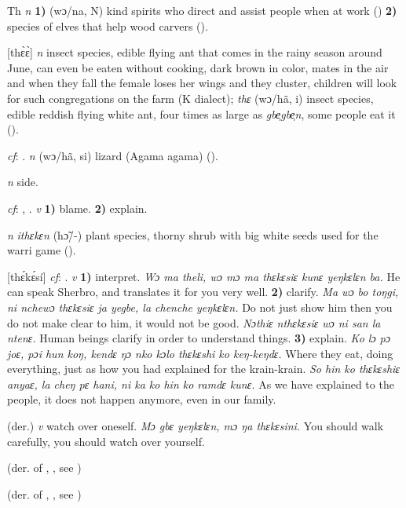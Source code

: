\begin{letter}{Th}
 \textit{n} \textbf{1)} (wɔ/na, N) kind spirits who direct and assist people when at work (\citealt{Pichl1967}) \textbf{2)} species of elves that help wood carvers (\citealt{Hall1938}).

 [thɛ̀ɛ̀] \textit{n} insect species, edible flying ant that comes in the rainy season around June, can even be eaten without cooking, dark brown in color, mates in the air and when they fall the female loses her wings and they cluster, children will look for such congregations on the farm (K dialect); \textit{thɛ} (wɔ/hã, i) insect species, edible reddish flying white ant, four times as large as \textit{gbe̹gbe̹n}, some people eat it (\citealt{Pichl1967}). 

 \textit{cf}: . \textit{n} (wɔ/hã, si) lizard (Agama agama) (\citealt{Pichl1967}). 

 \textit{n} side.

 \textit{cf}: , . \textit{v} \textbf{1)} blame. \textbf{2)} explain.

 \textit{n} \textit{ithɛkɛn} (hɔ̃/-) plant species, thorny shrub with big white seeds used for the warri game (\citealt{Pichl1967}). 

 [thɛ́kɛ́sí] \textit{cf}: . \textit{v} \textbf{1)} interpret. \textit{Wɔ ma theli, wɔ mɔ ma thɛkɛsiɛ kunɛ yeŋkɛlɛn ba.} He can speak Sherbro, and translates it for you very well. \textbf{2)} clarify. \textit{Ma wɔ bo toŋgi, ni nchewɔ thɛkɛsiɛ ja yegbe, la chenche yeŋkɛlɛn.} Do not just show him then you do not make clear to him, it would not be good. \textit{Nɔthiɛ nthɛkɛsiɛ wɔ ni san la ntenɛ.} Human beings clarify in order to understand things. \textbf{3)} explain. \textit{Ko lɔ pɔ joɛ, pɔi hun koŋ, kendɛ ŋɔ nko kɔlo thɛkɛshi ko keŋ-keŋdɛ.} Where they eat, doing everything, just as how you had explained for the krain-krain. \textit{So hin ko thɛkɛshiɛ anyaɛ, la cheŋ pɛ hani, ni ka ko hin ko ramdɛ kunɛ.} As we have explained to the people, it does not happen anymore, even in our family.

 (der.) \textit{v} watch over oneself. \textit{Mɔ gbɛ yeŋkɛlɛn, mɔ ŋa thɛkɛsini.} You should walk carefully, you should watch over yourself.

 (der. of , , see ) 

 (der. of , , see ) 


\end{letter}
